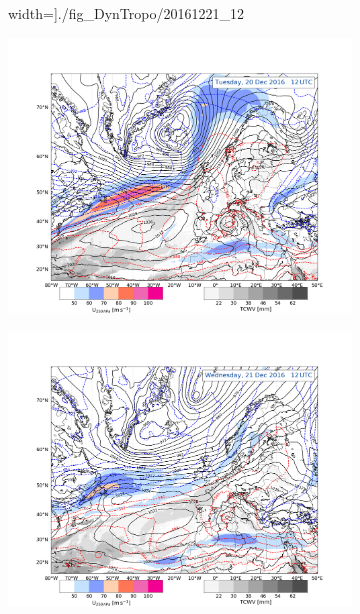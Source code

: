 \begin{figure}[h!]
\begin{subfigure}[b]{0.49\textwidth}
		width=\textwidth]{./fig_DynTropo/20161221_12}
		\caption{} \label{fig:DT21}
	\end{subfigure}
	\begin{subfigure}[b]{0.49\textwidth}
		\includegraphics[trim={4.2cm 0cm 4.3cm 5.1cm},clip,
		width=\textwidth]{./fig_Geopot_Jet/20161220_12}
		\caption{} \label{fig:GP20}
	\end{subfigure}
	\begin{subfigure}[b]{0.49\textwidth}
		\includegraphics[trim={4.2cm 0cm 4.3cm 5.1cm},clip,
		width=\textwidth]{./fig_Geopot_Jet/20161221_12}
		\caption{} \label{fig:GP21}

\end{subfigure}
\end{figure}
